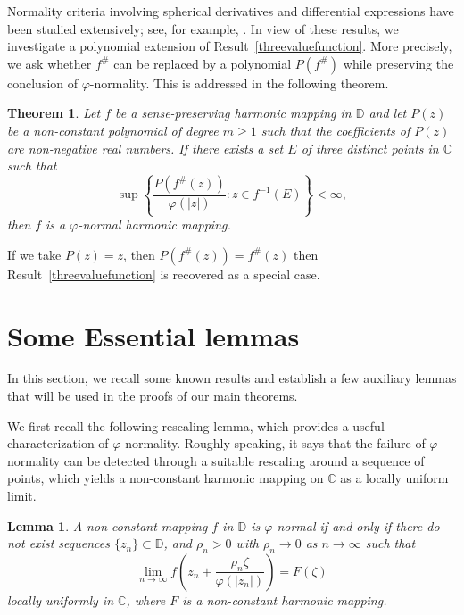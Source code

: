 \documentclass[10pt,a4paper]{amsart}
\numberwithin{equation}{section}
\newtheorem{theorem}{Theorem}[section]
\newtheorem{lemma}[definition]{Lemma}
\begin{document}
 Normality criteria involving spherical derivatives and
 differential expressions have been studied extensively;
 see, for example, \cite{chenlappan,Tanthin}. In view of these
results, we investigate a polynomial extension of Result~\ref{threevaluefunction}.
More precisely, we ask whether $f^\#$ can be replaced by a polynomial $P(f^\#)$
while preserving the conclusion of $\varphi$-normality. This is addressed in
the following theorem.
\begin{theorem}\label{threevaluepoly}
Let $f$ be a sense-preserving harmonic mapping in $\mathbb{D}$ and
 let $P(z)$ be a non-constant polynomial of degree $m \geq 1$ such 
 that
  the coefficients of $P(z)$ are non-negative real numbers. If there 
  exists a set $E$ of three distinct points in $\mathbb{C}$ such that
\begin{equation}\label{eq: threevaluepoly}
\sup \left\{
\frac{P\!\left(f^{\#}(z)\right)}{\varphi(|z|)}
: z \in f^{-1}(E)
\right\}
< \infty,
\end{equation}
then $f$ is a $\varphi$-normal harmonic mapping.
\end{theorem}

If we take $P(z)=z$, then $P(f^\#(z))=f^\#(z)$ then
 Result~\ref{threevaluefunction} is recovered as a special case.

\section{Some Essential lemmas}

In this section, we recall some known results and establish a
few auxiliary lemmas that will be used in the proofs of our
main theorems.
\smallskip

We first recall the following rescaling lemma, which provides a useful characterization of
$\varphi$-normality. Roughly speaking, it says that the failure of
$\varphi$-normality can be detected through a suitable rescaling around a
sequence of points, which yields a non-constant harmonic mapping on
$\mathbb{C}$ as a locally uniform limit.

\begin{lemma}\label{zalharfun}\cite[Theorem 1.3]{Bohra}
  A non-constant mapping $f$ in $\mathbb{D}$ is
   $\varphi$-normal if and only if there do not exist sequences
   $\{z_n\}\subset\mathbb{D}$, and $\rho_n >0$ with $\rho_n \to 0$ 
   as $n\to \infty$ such that
   \[
   \lim_{n\to\infty}f\left(z_n+\frac{\rho_n\zeta}{\varphi(|z_n|)}\right)=F(\zeta)
   \]
   locally uniformly in $\mathbb{C}$, where $F$ is a non-constant harmonic mapping.
  
  \end{lemma}
  
\end{document}
